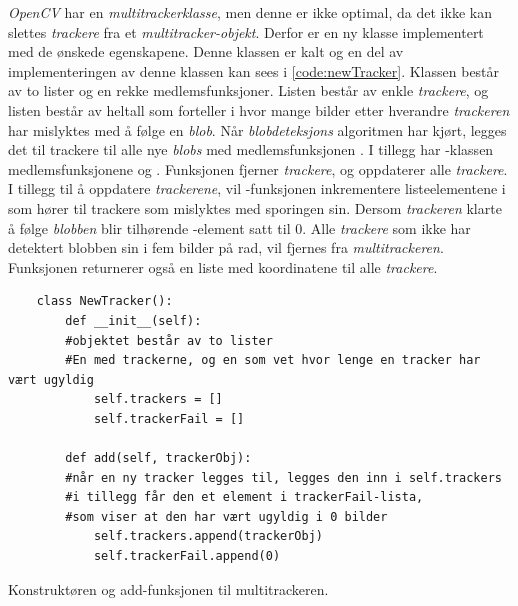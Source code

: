 \textit{OpenCV} har en \textit{multitrackerklasse}, men denne er ikke optimal, da det ikke kan slettes \textit{trackere} fra et \textit{multitracker-objekt}. 
Derfor er en ny klasse implementert med de ønskede egenskapene. 
Denne klassen er kalt  og en del av implementeringen av denne klassen kan sees i \autoref{code:newTracker}. 
Klassen består av to lister og en rekke medlemsfunksjoner. 
Listen  består av enkle \textit{trackere}, og listen  består av heltall som forteller i hvor mange bilder etter hverandre \textit{trackeren} har mislyktes med å følge en \textit{blob}. 
Når \textit{blobdeteksjons} algoritmen har kjørt, legges det til trackere til alle nye \textit{blobs} med medlemsfunksjonen .
I tillegg har -klassen medlemsfunksjonene  og \cite{GitHub}. 
Funksjonen  fjerner \textit{trackere}, og  oppdaterer alle \textit{trackere}. 
I tillegg til å oppdatere \textit{trackerene}, vil -funksjonen inkrementere listeelementene i  som hører til trackere som mislyktes med sporingen sin.
Dersom \textit{trackeren} klarte å følge \textit{blobben} blir tilhørende -element satt til $0$. 
Alle \textit{trackere} som ikke har detektert blobben sin i fem bilder på rad, vil fjernes fra \textit{multitrackeren}. Funksjonen  returnerer også en liste med koordinatene til alle \textit{trackere}.


\begin{listing}[!htb]
\begin{verbatim}
    class NewTracker():                     
        def __init__(self):
        #objektet består av to lister
        #En med trackerne, og en som vet hvor lenge en tracker har vært ugyldig
            self.trackers = []             
            self.trackerFail = []
    
        def add(self, trackerObj):
        #når en ny tracker legges til, legges den inn i self.trackers
        #i tillegg får den et element i trackerFail-lista,
        #som viser at den har vært ugyldig i 0 bilder
            self.trackers.append(trackerObj)
            self.trackerFail.append(0)
\end{verbatim}
\caption{Konstruktøren og add-funksjonen til multitrackeren.}
\label{code:newTracker}
\end{listing}


